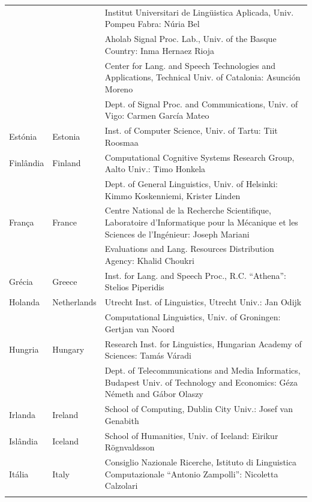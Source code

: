 \begin{longtable}{llp{105mm}}
  & & Institut Universitari de Lingüistica Aplicada, Univ. Pompeu Fabra: Núria Bel \\ \addlinespace 
  & & Aholab Signal Proc. Lab., Univ. of the Basque Country: Inma Hernaez Rioja \\ \addlinespace 
  & & Center for Lang. and Speech Technologies and Applications, Technical Univ. of Catalonia: Asunción Moreno \\ \addlinespace 
  & & Dept. of Signal Proc. and Communications, Univ. of Vigo: Carmen García Mateo \\ \addlinespace 
  Estónia & \textcolor{grey1}{Estonia} & Inst. of Computer Science, Univ. of Tartu: Tiit Roosmaa \\ \addlinespace
  Finlândia & \textcolor{grey1}{Finland} & Computational Cognitive Systems Research Group, Aalto Univ.: Timo Honkela \\ \addlinespace
  & & Dept. of General Linguistics, Univ. of Helsinki: Kimmo Koskenniemi, Krister Linden \\ \addlinespace
  França & \textcolor{grey1}{France} & Centre National de la Recherche Scientifique, Laboratoire d'Informatique pour la Mécanique et les Sciences de l'Ingénieur: Joseph Mariani \\ \addlinespace
  & & Evaluations and Lang. Resources Distribution Agency: Khalid Choukri \\ \addlinespace 
  Grécia & \textcolor{grey1}{Greece} & Inst. for Lang. and Speech Proc., R.C. “Athena”: Stelios Piperidis \\ \addlinespace
  Holanda & \textcolor{grey1}{Netherlands} & Utrecht Inst. of Linguistics, Utrecht Univ.: Jan Odijk \\ \addlinespace 
  & & Computational Linguistics, Univ. of Groningen: Gertjan van Noord \\ \addlinespace
  Hungria & \textcolor{grey1}{Hungary} & Research Inst. for Linguistics, Hungarian Academy of Sciences: Tamás Váradi \\  \addlinespace
  & & Dept. of Telecommunications and Media Informatics, Budapest Univ. of Technology and Economics: Géza Németh and Gábor Olaszy \\ \addlinespace
  Irlanda & \textcolor{grey1}{Ireland} & School of Computing, Dublin City Univ.: Josef van Genabith \\ \addlinespace
  Islândia & \textcolor{grey1}{Iceland} & School of Humanities, Univ. of Iceland: Eirikur Rögnvaldsson \\ \addlinespace
  Itália & \textcolor{grey1}{Italy} & Consiglio Nazionale Ricerche, Istituto di Linguistica Computazionale “Antonio Zampolli”: Nicoletta Calzolari \\ \addlinespace

\end{longtable}

